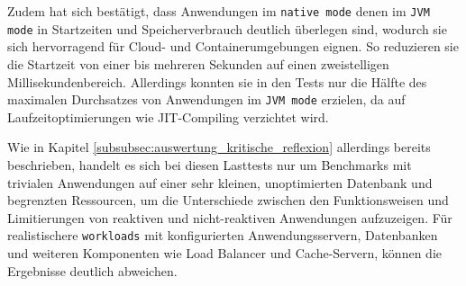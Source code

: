Zudem hat sich bestätigt, dass Anwendungen im \verb|native mode| denen im \verb|JVM mode| in Startzeiten und Speicherverbrauch deutlich überlegen sind,
wodurch sie sich hervorragend für Cloud- und Containerumgebungen eignen. So reduzieren sie die Startzeit von einer bis mehreren Sekunden auf
einen zweistelligen Millisekundenbereich. Allerdings konnten sie in den Tests nur die Hälfte des maximalen Durchsatzes von Anwendungen im
\verb|JVM mode| erzielen, da auf Laufzeitoptimierungen wie JIT-Compiling verzichtet wird.

Wie in Kapitel \ref{subsubsec:auswertung_kritische_reflexion} allerdings bereits beschrieben, handelt es sich bei diesen Lasttests nur um
Benchmarks mit trivialen Anwendungen auf einer sehr kleinen, unoptimierten Datenbank und begrenzten Ressourcen, um
die Unterschiede zwischen den Funktionsweisen und Limitierungen von reaktiven und nicht-reaktiven Anwendungen aufzuzeigen.
Für realistischere \verb|workloads| mit konfigurierten Anwendungsservern, Datenbanken und weiteren Komponenten wie Load Balancer und
Cache-Servern, können die Ergebnisse deutlich abweichen.